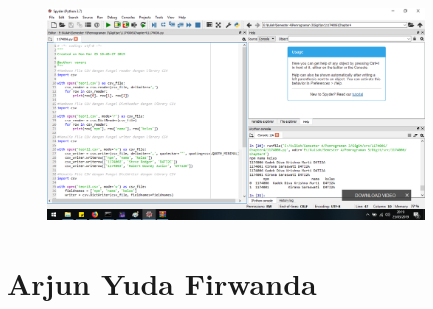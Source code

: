 \begin{figure}[H]
	\includegraphics[width=10cm]{figures/diva/Chapter4/kode_teori2.png}
	\centering
\end{figure}

\section{Arjun Yuda Firwanda}

